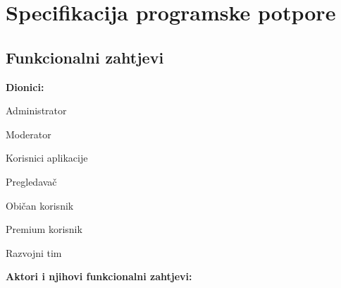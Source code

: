 \chapter{Specifikacija programske potpore}
		
	\section{Funkcionalni zahtjevi}
			

			

				

			
			
			\noindent \textbf{Dionici:}
			
			\begin{packed_enum}
				
				\item Administrator
				\item Moderator			
				\item Korisnici aplikacije
					\begin{packed_enum}
						
						\item  Pregledavač
						\item  Običan korisnik
						\item  Premium korisnik
					
					\end{packed_enum}
				\item Razvojni tim	
				
			\end{packed_enum}
			
			\noindent \textbf{Aktori i njihovi funkcionalni zahtjevi:}
			
